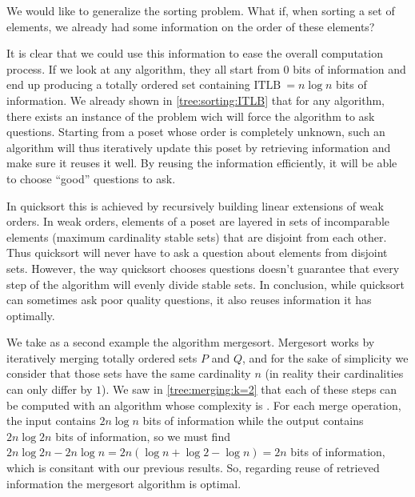 
We would like to generalize the sorting problem. What if, when sorting a set of
elements, we already had some information on the order of these elements?


It is clear that we could use this information to ease the overall computation
process. If we look at any  algorithm, they all start from
$0$ bits of information and end up producing a totally ordered set containing
$\text{ITLB}~= n \log n$ bits of information. We already shown in
\ref{tree:sorting:ITLB} that for any algorithm, there exists an instance of the
problem wich will force the algorithm to ask  questions.
Starting from a poset whose order is completely unknown, such an algorithm will
thus iteratively update this poset by retrieving information and make sure it
reuses it well. By reusing the information efficiently, it will be able to
choose ``good'' questions to ask.


In quicksort this is achieved by recursively building linear extensions of weak
orders. In weak orders, elements of a poset are layered in sets of incomparable
elements (maximum cardinality stable sets) that are disjoint from each other.
Thus quicksort will never have to ask a question about elements from disjoint
sets. However, the way quicksort chooses questions doesn't guarantee that every
step of the algorithm will evenly divide stable sets. In conclusion, while
quicksort can sometimes ask poor quality questions, it also reuses information
it has optimally.


We take as a second example the algorithm mergesort. Mergesort works by
iteratively merging totally ordered sets $P$ and $Q$, and for the sake of
simplicity we consider that those sets have the same cardinality $n$  (in
reality their cardinalities can only differ by $1$). We saw in
\ref{tree:merging:k=2} that each of these steps can be computed with an
algorithm whose complexity is . For each merge operation, the input
contains $2n \log n$ bits of information while the output contains $2n \log 2n$
bits of information, so we must find $2n \log 2n - 2n \log n = 2n (\log n +
\log 2 - \log n) = 2n$ bits of information, which is consitant with our
previous results. So, regarding reuse of retrieved information the mergesort
algorithm is optimal.

